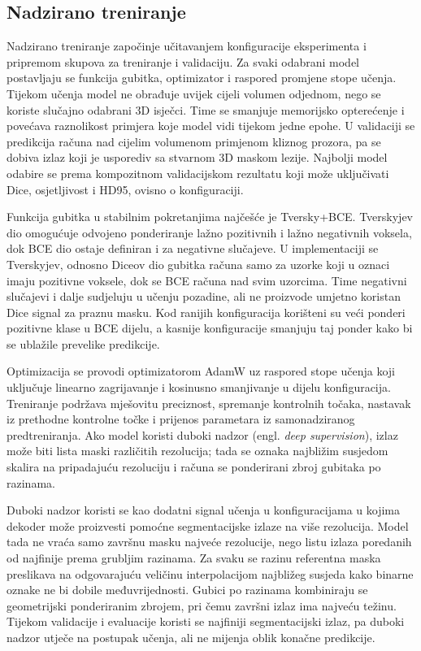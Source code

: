 \documentclass[a4paper,12pt,oneside]{article}
\begin{document}
\subsection{Nadzirano treniranje}

Nadzirano treniranje započinje učitavanjem konfiguracije eksperimenta i pripremom skupova za treniranje i validaciju. Za svaki odabrani model postavljaju se funkcija gubitka, optimizator i raspored promjene stope učenja. Tijekom učenja model ne obrađuje uvijek cijeli volumen odjednom, nego se koriste slučajno odabrani 3D isječci. Time se smanjuje memorijsko opterećenje i povećava raznolikost primjera koje model vidi tijekom jedne epohe. U validaciji se predikcija računa nad cijelim volumenom primjenom kliznog prozora, pa se dobiva izlaz koji je usporediv sa stvarnom 3D maskom lezije. Najbolji model odabire se prema kompozitnom validacijskom rezultatu koji može uključivati Dice, osjetljivost i HD95, ovisno o konfiguraciji.

Funkcija gubitka u stabilnim pokretanjima najčešće je Tversky+BCE. Tverskyjev dio omogućuje odvojeno ponderiranje lažno pozitivnih i lažno negativnih voksela, dok BCE dio ostaje definiran i za negativne slučajeve. U implementaciji se Tverskyjev, odnosno Diceov dio gubitka računa samo za uzorke koji u oznaci imaju pozitivne voksele, dok se BCE računa nad svim uzorcima. Time negativni slučajevi i dalje sudjeluju u učenju pozadine, ali ne proizvode umjetno koristan Dice signal za praznu masku. Kod ranijih konfiguracija korišteni su veći ponderi pozitivne klase u BCE dijelu, a kasnije konfiguracije smanjuju taj ponder kako bi se ublažile prevelike predikcije.

Optimizacija se provodi optimizatorom AdamW uz raspored stope učenja koji uključuje linearno zagrijavanje i kosinusno smanjivanje u dijelu konfiguracija. Treniranje podržava mješovitu preciznost, spremanje kontrolnih točaka, nastavak iz prethodne kontrolne točke i prijenos parametara iz samonadziranog predtreniranja. Ako model koristi duboki nadzor (engl. \textit{deep supervision}), izlaz može biti lista maski različitih rezolucija; tada se oznaka najbližim susjedom skalira na pripadajuću rezoluciju i računa se ponderirani zbroj gubitaka po razinama.

Duboki nadzor koristi se kao dodatni signal učenja u konfiguracijama u kojima dekoder može proizvesti pomoćne segmentacijske izlaze na više rezolucija. Model tada ne vraća samo završnu masku najveće rezolucije, nego listu izlaza poredanih od najfinije prema grubljim razinama. Za svaku se razinu referentna maska preslikava na odgovarajuću veličinu interpolacijom najbližeg susjeda kako binarne oznake ne bi dobile međuvrijednosti. Gubici po razinama kombiniraju se geometrijski ponderiranim zbrojem, pri čemu završni izlaz ima najveću težinu. Tijekom validacije i evaluacije koristi se najfiniji segmentacijski izlaz, pa duboki nadzor utječe na postupak učenja, ali ne mijenja oblik konačne predikcije.
\end{document}
